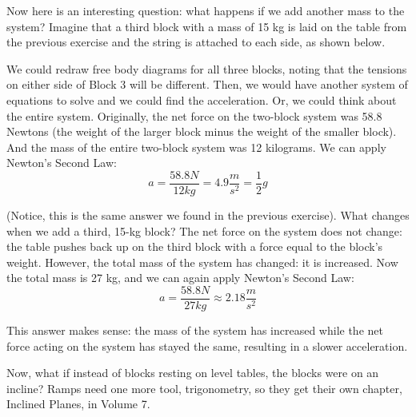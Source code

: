 Now here is an interesting question: what happens if we add another mass to the 
system? Imagine that a third block with a mass of 15 kg is laid on the table 
from the previous exercise and the string is attached to each side, as shown 
below. 
\begin{center}
\end{center}

We could redraw free body diagrams for all three blocks, noting that the 
tensions on either side of Block 3 will be different. Then, we would have 
another system of equations to solve and we could find the acceleration. Or, 
we could think about the entire system. Originally, the net force on the 
two-block system was 58.8 Newtons (the weight of the larger block minus the 
weight of the smaller block). And the mass of the entire two-block system was 
12 kilograms. We can apply Newton's Second Law:
$$a = \frac{58.8 N}{12 kg} = 4.9 \frac{m}{s^2} = \frac{1}{2}g$$

(Notice, this is the same answer we found in the previous exercise). What 
changes when we add a third, 15-kg block? The net force on the system does not 
change: the table pushes back up on the third block with a force equal to the 
block's weight. However, the total mass of the system has changed: it is 
increased. Now the total mass is 27 kg, and we can again apply Newton's Second 
Law:
$$a = \frac{58.8 N}{27 kg} \approx 2.18 \frac{m}{s^2}$$

This answer makes sense: the mass of the system has increased while the net 
force acting on the system has stayed the same, resulting in a slower acceleration. 

Now, what if instead of blocks resting on level tables, the blocks were on an incline? Ramps need one more tool, trigonometry, so they get their own chapter, Inclined Planes, in Volume 7.
